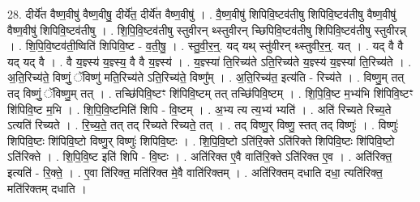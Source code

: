 \documentclass[17pt]{extarticle}
\begin{document}
28. दीर्ये॑त वैष्ण॒वीषु॑ वैष्ण॒वीषु॒ दीर्ये॑त॒ दीर्ये॑त वैष्ण॒वीषु॑ । . वै॒ष्ण॒वीषु॑ शिपिवि॒ष्टव॑तीषु शिपिवि॒ष्टव॑तीषु वैष्ण॒वीषु॑ वैष्ण॒वीषु॑ शिपिवि॒ष्टव॑तीषु । . शि॒पि॒वि॒ष्टव॑तीषु स्तुवीरन् थ्स्तुवीरन् च्छिपिवि॒ष्टव॑तीषु शिपिवि॒ष्टव॑तीषु स्तुवीरन्न् । . शि॒पि॒वि॒ष्टव॑ती॒ष्विति॑ शिपिवि॒ष्ट - व॒ती॒षु॒ । . स्तु॒वी॒र॒न्॒. यद् यथ् स्तु॑वीरन् थ्स्तुवीर॒न्॒. यत् । . यद् वै वै यद् यद् वै । . वै य॒ज्ञ्स्य॑ य॒ज्ञ्स्य॒ वै वै य॒ज्ञ्स्य॑ । . य॒ज्ञ्स्या॑ ति॒रिच्य॑ते ऽति॒रिच्य॑ते य॒ज्ञ्स्य॑ य॒ज्ञ्स्या॑ ति॒रिच्य॑ते । . अ॒ति॒रिच्य॑ते॒ विष्णुं॒ ॅविष्णु॑ मति॒रिच्य॑ते ऽति॒रिच्य॑ते॒ विष्णु᳚म् । . अ॒ति॒रिच्य॑त॒ इत्य॑ति - रिच्य॑ते । . विष्णु॒म् तत् तद् विष्णुं॒ ॅविष्णु॒म् तत् । . तच्छि॑पिवि॒ष्टꣳ शि॑पिवि॒ष्टम् तत् तच्छि॑पिवि॒ष्टम् । . शि॒पि॒वि॒ष्ट म॒भ्य॑भि शि॑पिवि॒ष्टꣳ शि॑पिवि॒ष्ट म॒भि । . शि॒पि॒वि॒ष्टमिति॑ शिपि - वि॒ष्टम् । . अ॒भ्य त्य त्य॒भ्य॑ भ्यति॑ । . अति॑ रिच्यते रिच्य॒ते ऽत्यति॑ रिच्यते । . रि॒च्य॒ते॒ तत् तद् रि॑च्यते रिच्यते॒ तत् । . तद् विष्णु॒र् विष्णु॒ स्तत् तद् विष्णुः॑ । . विष्णुः॑ शिपिवि॒ष्टः शि॑पिवि॒ष्टो विष्णु॒र् विष्णुः॑ शिपिवि॒ष्टः । . शि॒पि॒वि॒ष्टो ऽति॑रि॒क्ते ऽति॑रिक्ते शिपिवि॒ष्टः शि॑पिवि॒ष्टो ऽति॑रिक्ते । . शि॒पि॒वि॒ष्ट इति॑ शिपि - वि॒ष्टः । . अति॑रिक्त ए॒वै वाति॑रि॒क्ते ऽति॑रिक्त ए॒व । . अति॑रिक्त॒ इत्यति॑ - रि॒क्ते॒ । . ए॒वा ति॑रिक्त॒ मति॑रिक्त मे॒वै वाति॑रिक्तम् । . अति॑रिक्तम् दधाति दधा॒ त्यति॑रिक्त॒ मति॑रिक्तम् दधाति । \newline
\end{document}
